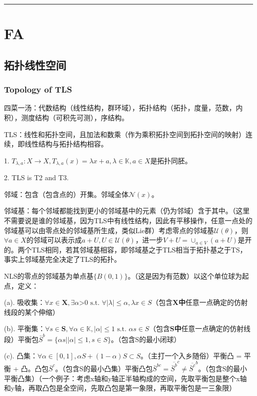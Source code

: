 \vspace{5pt} \hrule \vspace{5pt}

\chapter{FA}

\section{拓扑线性空间}

\subsection{Topology of TLS}
四菜一汤：代数结构（线性结构，群环域），拓扑结构（拓扑，度量，范数，内积），测度结构（可积先可测），序结构。

TLS：线性和拓扑空间，且加法和数乘（作为乘积拓扑空间到拓扑空间的映射）连续，即线性结构与拓扑结构相容。

1. $T_{\lambda, a}: X \to X, T_{\lambda, a}(x) = \lambda x + a, \lambda \in \mathbb{K}, a \in X$是拓扑同胚。

2. TLS is T2 and T3.

邻域：包含（包含点的）开集。邻域全体$\mathcal{N}(x)$。

邻域基：每个邻域都能找到更小的邻域基中的元素（仍为邻域）含于其中。（这里不需要说是谁的邻域基，因为TLS中有线性结构，因此有平移操作，任意一点处的邻域基可以由零点处的邻域基所生成，类似Lie群）考虑零点的邻域基$\mathcal{U}(\theta)$，则$\forall a \in X$的邻域可以表示成$a + U, U \in \mathcal{U}(\theta)$，进一步$V + U = \cup_{a \in V} (a + U)$是开的。两个TLS相同，若其邻域基相容，即邻域基之于TLS相当于拓扑基之于TS，事实上邻域基完全决定了TLS的拓扑。

NLS的零点的邻域基为单点基$\{ B(0, 1) \}$。（这是因为有范数）以这个单位球为起点，定义：

(a). 吸收集：$\forall x \in \textbf{X}, \exists \alpha \textbf{>} 0 \text{ s.t. } \forall |\lambda| \le \alpha, \lambda x \in S$（包含\textbf{X中}任意一点确定的仿射线段的某个伸缩）

(b). 平衡集：$\forall s \in \textbf{S}, \forall \alpha \in \mathbb{K}, |\alpha| \le 1 \text{ s.t. }  \alpha s \in S$（包含\textbf{S中}任意一点确定的仿射线段）平衡包$\bar{S}^b = \{ \alpha s | |\alpha| \le 1, s \in S \}$。（包含S的最小闭球）

(c). 凸集：$\forall \alpha \in [0, 1], \alpha S + (1 - \alpha) S \subset S$。（主打一个入乡随俗）平衡凸 = 平衡 + 凸。凸包$\bar{S}^c$。（包含S的最小凸集）平衡凸包$\bar{S}^{bc} = \overline{\bar{S}^b}^c \neq \overline{\bar{S}^c}^b$。（包含S的最小平衡凸集）（一个例子：考虑x轴和y轴正半轴构成的空间，先取平衡包是整个x轴和y轴，再取凸包是全空间，先取凸包是第一象限，再取平衡包是一三象限）

